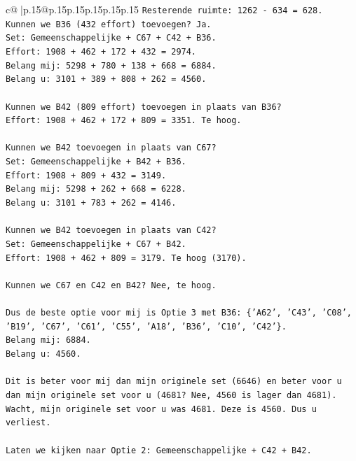\documentclass{article}
\begin{document}
{\begin{supertabular}{c@{$\;$}|p{.15\linewidth}@{}p{.15\linewidth}p{.15\linewidth}p{.15\linewidth}p{.15\linewidth}p{.15\linewidth}}
{{{\texttt{Resterende ruimte: 1262 {-} 634 = 628.} \\
\texttt{Kunnen we B36 (432 effort) toevoegen? Ja.} \\
\texttt{Set: Gemeenschappelijke + C67 + C42 + B36.} \\
\texttt{Effort: 1908 + 462 + 172 + 432 = 2974.} \\
\texttt{Belang mij: 5298 + 780 + 138 + 668 = 6884.} \\
\texttt{Belang u: 3101 + 389 + 808 + 262 = 4560.} \\
\\ 
\texttt{Kunnen we B42 (809 effort) toevoegen in plaats van B36?} \\
\texttt{Effort: 1908 + 462 + 172 + 809 = 3351. Te hoog.} \\
\\ 
\texttt{Kunnen we B42 toevoegen in plaats van C67?} \\
\texttt{Set: Gemeenschappelijke + B42 + B36.} \\
\texttt{Effort: 1908 + 809 + 432 = 3149.} \\
\texttt{Belang mij: 5298 + 262 + 668 = 6228.} \\
\texttt{Belang u: 3101 + 783 + 262 = 4146.} \\
\\ 
\texttt{Kunnen we B42 toevoegen in plaats van C42?} \\
\texttt{Set: Gemeenschappelijke + C67 + B42.} \\
\texttt{Effort: 1908 + 462 + 809 = 3179. Te hoog (3170).} \\
\\ 
\texttt{Kunnen we C67 en C42 en B42? Nee, te hoog.} \\
\\ 
\texttt{Dus de beste optie voor mij is Optie 3 met B36: \{'A62', 'C43', 'C08', 'B19', 'C67', 'C61', 'C55', 'A18', 'B36', 'C10', 'C42'\}.} \\
\texttt{Belang mij: 6884.} \\
\texttt{Belang u: 4560.} \\
\\ 
\texttt{Dit is beter voor mij dan mijn originele set (6646) en beter voor u dan mijn originele set voor u (4681? Nee, 4560 is lager dan 4681).} \\
\texttt{Wacht, mijn originele set voor u was 4681. Deze is 4560. Dus u verliest.} \\
\\ 
\texttt{Laten we kijken naar Optie 2: Gemeenschappelijke + C42 + B42.} \\
}}}
\end{supertabular}}
\end{document}
